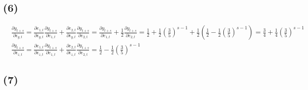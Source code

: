 \documentclass{article}
\begin{document}
\subsection{(6)}
\begin{align*}
	&\frac{\partial y_{t+s}}{\partial \epsilon_{y, t}} = \frac{\partial e_{1,t}}{\partial \epsilon_{y, t}} \frac{\partial y_{t+s}}{\partial e_{1, t}} + \frac{\partial e_{2,t}}{\partial \epsilon_{y, t}} \frac{\partial y_{t+s}}{\partial e_{2, t}} = \frac{\partial y_{t+s}}{\partial e_{1, t}} + \frac{1}{2} \frac{\partial y_{t+s}}{\partial e_{2, t}}= \frac{1}{2} + \frac{1}{2} \left( \frac{3}{5} \right)^{s-1} + \frac{1}{2} \left( \frac{1}{2} -\frac{1}{2} \left( \frac{3}{5}\right)^{s-1} \right) = \frac{3}{4}+\frac{1}{4}\left( \frac{3}{5} \right)^{s-1} \\[8pt]
	&\frac{\partial y_{t+s}}{\partial \epsilon_{z, t}} = \frac{\partial e_{1,t}}{\partial \epsilon_{z, t}} \frac{\partial y_{t+s}}{\partial e_{1, t}} + \frac{\partial e_{2,t}}{\partial \epsilon_{z, t}} \frac{\partial y_{t+s}}{\partial e_{2, t}} = \frac{1}{2} -\frac{1}{2} \left( \frac{3}{5}\right)^{s-1} 
\end{align*}


\subsection{(7)}
\end{document}
